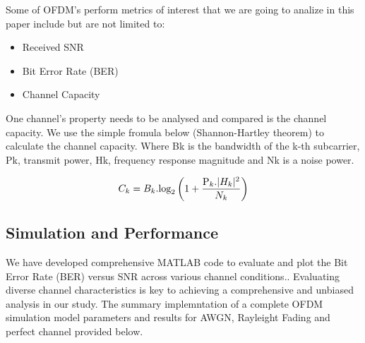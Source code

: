 \documentclass[conference]{IEEEtran}
\begin{document}
Some of OFDM's perform metrics of interest that we are going to analize in this paper include but are not limited to:

\begin{itemize}
\item Received SNR
\item Bit Error Rate (BER)
\item Channel Capacity
\end{itemize}

One channel's property needs to be analysed and compared is the channel capacity. We use the simple fromula below (Shannon-Hartley theorem) to calculate the channel capacity. 
Where Bk is the bandwidth of the k-th subcarrier, Pk, transmit power, Hk, frequency response magnitude and Nk is a noise power.   
	

			\begin{equation}
			C_{k} = B_{k}.\text{log}_2\left(1 +\frac{ \text P_{k}.|H_{k}|^2}{N_{k}}\right)
	    		\label{eq:ofdm_capacity}
	    		\end{equation}

\subsection {Simulation and Performance}
      
      We have developed comprehensive MATLAB code to evaluate and plot the Bit Error Rate (BER) versus SNR across various channel conditions.. Evaluating diverse channel characteristics is key to achieving a comprehensive and unbiased analysis in our study. The summary implemntation of a complete OFDM simulation model parameters and results for AWGN, Rayleight Fading and perfect channel provided below. 
      
\end{document}
